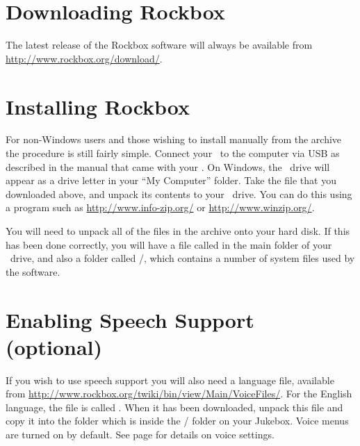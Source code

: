 
\section{Downloading Rockbox}
The latest release of the Rockbox software will always be available from
\url{http://www.rockbox.org/download/}.

\section{Installing Rockbox}\label{sec:installing_rockbox}
For non{}-Windows users and those wishing to install manually from the archive
the procedure is still fairly simple.  Connect your \playername\ to the
computer via USB as described in the manual that came with your \playername. On
Windows, the \playername\ drive will appear as a drive letter in your
``My Computer'' folder. Take the file that you downloaded above, and unpack
its contents to your \playername\ drive. You can do this using a program such
as \url{http://www.info-zip.org/} or \url{http://www.winzip.org/}.

You will need to unpack all of the files in the archive onto your hard disk. If
 this has been done correctly, you will have a file called 
\fname{\firmwarefilename} in the main folder of your \playername\ drive, and
also a folder called /, which contains a number of system files
used by the software.

\section{Enabling Speech Support (optional)}\label{sec:enabling_speech_support}
If you wish to use speech support you will also need a language file, available
from \url{http://www.rockbox.org/twiki/bin/view/Main/VoiceFiles/}.  For the
English language, the file is called . When it has been
downloaded, unpack this file and copy it into the  folder which is
inside the / folder on your Jukebox. Voice menus are turned on
by default. See page \pageref{ref:Voiceconfiguration} for details on voice
settings.


